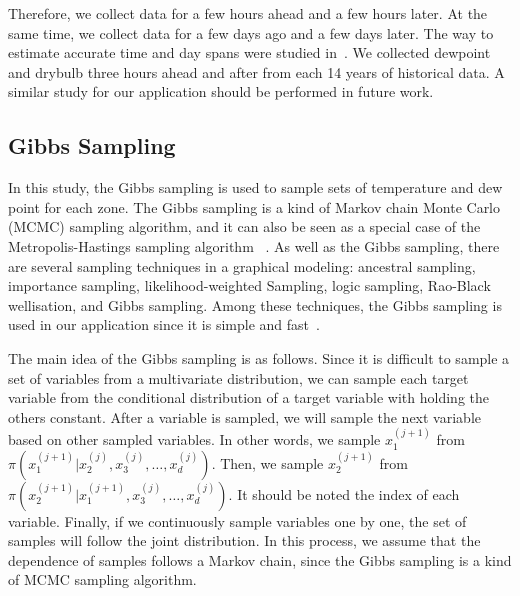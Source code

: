 \documentclass[journal]{IEEEtran} %
\begin{document}
Therefore, we collect data for a few hours ahead and a few hours later. At the same time, we collect data for a few days ago and a few days later. The way to estimate accurate time and day spans were studied in~\cite{xie2016temperature}. We collected dewpoint and drybulb three hours ahead and after from each 14 years of historical data. A similar study for our application should be performed in future work.

















\subsection{Gibbs Sampling}
In this study, the Gibbs sampling is used to sample sets of temperature and dew point for each zone. The Gibbs sampling is a kind of Markov chain Monte Carlo (MCMC) sampling algorithm, and it can also be seen as a special case of the Metropolis-Hastings sampling algorithm~\cite{Bishop} . As well as the Gibbs sampling, there are several sampling techniques in a graphical modeling: ancestral sampling, importance sampling, likelihood-weighted Sampling, logic sampling, Rao-Black wellisation, and Gibbs sampling. Among these techniques, the Gibbs sampling is used in our application since it is simple and fast~\cite{Gibbs}.


The main idea of the Gibbs sampling is as follows. Since it is difficult to sample a set of variables from a multivariate distribution, we can sample each target variable from the conditional distribution of a target variable with holding the others constant. After a variable is sampled, we will sample the next variable based on other sampled variables. In other words, we sample $x_1^{(j + 1)}$ from $\pi (x_1^{(j + 1)}|x_2^{(j)},x_3^{(j)}, \ldots ,x_d^{(j)})$. Then, we sample $x_2^{(j + 1)}$ from $\pi (x_2^{(j + 1)}|x_1^{(j+1)},x_3^{(j)}, \ldots ,x_d^{(j)})$. It should be noted the index of each variable. Finally, if we continuously sample variables one by one, the set of samples will follow the joint distribution. In this process, we assume that the dependence of samples follows a Markov chain, since the Gibbs sampling is a kind of MCMC sampling algorithm. 
\end{document}

